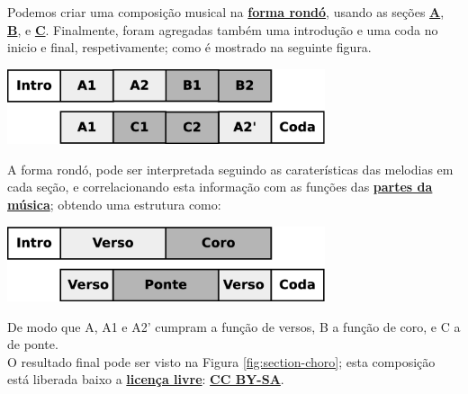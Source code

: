 \begin{example}
Podemos criar uma composição musical na \hyperref[subsec:formarondo]{\textbf{forma rondó}}, usando as seções 
\hyperref[subsec:criandoa]{\textbf{A}}, 
\hyperref[subsec:criandob]{\textbf{B}}, e
\hyperref[subsec:criandob]{\textbf{C}}.
Finalmente, foram agregadas também uma introdução e uma coda no inicio e final, respetivamente; 
como é mostrado na seguinte figura.
\begin{center}
	     \includegraphics[width=0.70\textwidth]{chapters/cap-musica-topicos/section-choro-block.eps}
\end{center}
A forma rondó, pode ser interpretada seguindo as caraterísticas das melodias em cada seção, 
e correlacionando esta informação com as funções das 
\hyperref[subsec:partesmusica]{\textbf{partes da música}};
obtendo uma estrutura como: 
\begin{center}
	     \includegraphics[width=0.70\textwidth]{chapters/cap-musica-topicos/section-choro-block2.eps}
\end{center}
De modo que  A, A1 e A2' cumpram a função de versos,  B a função de coro, e C a de ponte. \\
O resultado final pode ser visto na Figura \ref{fig:section-choro};
esta composição está liberada baixo a 
\hyperref[ref:licensalivre]{\textbf{licença livre}}:
\hyperref[subsec:CCBYSA]{\textbf{CC BY-SA}}.
\end{example}



